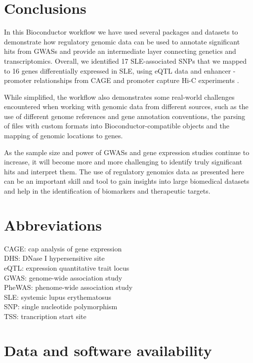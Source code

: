 \documentclass[9pt,a4paper,]{extarticle}
\begin{document}
\section{Conclusions}\label{conclusions}

In this Bioconductor workflow we have used several packages and datasets to demonstrate how regulatory genomic data can be used to annotate significant hits from GWASs and provide an intermediate layer connecting genetics and transcriptomics.
Overall, we identified 17 SLE-associated SNPs that we mapped to 16 genes differentially expressed in SLE, using eQTL data \citep{GTEx2017} and enhancer - promoter relationships from CAGE \citep{Fantom2014} and promoter capture Hi-C experiments \citep{Javierre2016}.

While simplified, the workflow also demonstrates some real-world challenges encountered when working with genomic data from different sources, such as the use of different genome references and gene annotation conventions, the parsing of files with custom formats into Bioconductor-compatible objects and the mapping of genomic locations to genes.

As the sample size and power of GWASs and gene expression studies continue to increase, it will become more and more challenging to identify truly significant hits and interpret them.
The use of regulatory genomics data as presented here can be an important skill and tool to gain insights into large biomedical datasets and help in the identification of biomarkers and therapeutic targets.

\section{Abbreviations}\label{abbreviations}

CAGE: cap analysis of gene expression\\
DHS: DNase I hypersensitive site\\
eQTL: expression quantitative trait locus\\
GWAS: genome-wide association study\\
PheWAS: phenome-wide association study\\
SLE: systemic lupus erythematosus\\
SNP: single nucleotide polymorphism\\
TSS: trancription start site

\section{Data and software availability}\label{data-and-software-availability}
\end{document}
